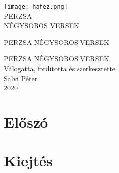 

\frontmatter
{}

\begin{titlepage}
\centering
\texttt{[image: hafez.png]}\\
\vspace{\fill}
\Large PERZSA\\NÉGYSOROS VERSEK
\end{titlepage}

\thispagestyle{empty}
\newpage

\begin{titlepage}
\thispagestyle{plain}
\centering
\vspace*{2cm}
{\large PERZSA NÉGYSOROS VERSEK}
\end{titlepage}

\thispagestyle{empty}
\newpage

\begin{titlepage}
\thispagestyle{plain}
\centering
\vspace*{2cm}
{\Large PERZSA NÉGYSOROS VERSEK}\\
\vspace{7cm}
{\large Válogatta, fordította és szerkesztette}\\
\vspace{1em}
{\large Salvi Péter}\\
\vspace{1em}
2020
\end{titlepage}





\addtocounter{page}{2}


\thispagestyle{empty}
\newpage

\chapter*{Előszó}


\chapter*{Kiejtés}


